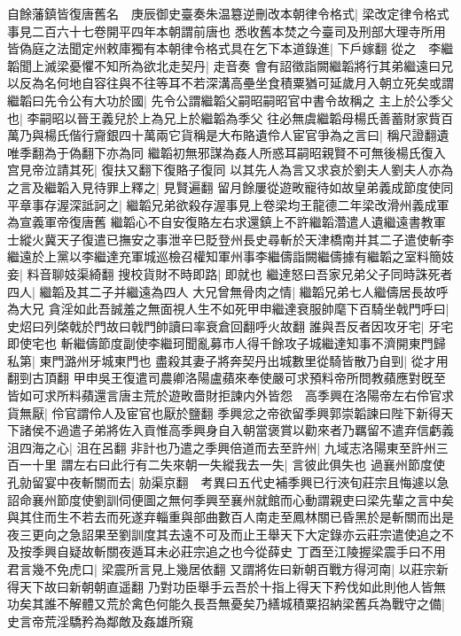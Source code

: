自餘藩鎮皆復唐舊名　庚辰御史臺奏朱温簒逆刪改本朝律令格式|{
	梁改定律令格式事見二百六十七卷開平四年本朝謂前唐也}
悉收舊本焚之今臺司及刑部大理寺所用皆偽庭之法聞定州敕庫獨有本朝律令格式具在乞下本道錄進|{
	下戶嫁翻}
從之　李繼韜聞上滅梁憂懼不知所為欲北走契丹|{
	走音奏}
會有詔徵詣闕繼韜將行其弟繼遠曰兄以反為名何地自容往與不往等耳不若深溝高壘坐食積粟猶可延歲月入朝立死矣或謂繼韜曰先令公有大功於國|{
	先令公謂繼韜父嗣昭嗣昭官中書令故稱之}
主上於公季父也|{
	李嗣昭以晉王義兒於上為兄上於繼韜為季父}
往必無虞繼韜母楊氏善蓄財家貲百萬乃與楊氏偕行齎銀四十萬兩它貨稱是大布賂遺伶人宦官爭為之言曰|{
	稱尺證翻遺唯季翻為于偽翻下亦為同}
繼韜初無邪謀為姦人所惑耳嗣昭親賢不可無後楊氏復入宫見帝泣請其死|{
	復扶又翻下復賂子復同}
以其先人為言又求哀於劉夫人劉夫人亦為之言及繼韜入見待罪上釋之|{
	見賢遍翻}
留月餘屢從遊畋寵待如故皇弟義成節度使同平章事存渥深詆訶之|{
	繼韜兄弟欲殺存渥事見上卷梁均王龍德二年梁改滑州義成軍為宣義軍帝復唐舊}
繼韜心不自安復賂左右求還鎮上不許繼韜濳遣人遺繼遠書教軍士縱火冀天子復遣已撫安之事泄辛巳貶登州長史尋斬於天津橋南并其二子遣使斬李繼遠於上黨以李繼達充軍城巡檢召權知軍州事李繼儔詣闕繼儔據有繼韜之室料簡妓妾|{
	料音聊妓渠綺翻}
搜校貨財不時即路|{
	即就也}
繼達怒曰吾家兄弟父子同時誅死者四人|{
	繼韜及其二子并繼遠為四人}
大兄曾無骨肉之情|{
	繼韜兄弟七人繼儔居長故呼為大兄}
貪淫如此吾誠羞之無面視人生不如死甲申繼達衰服帥麾下百騎坐戟門呼曰|{
	史炤曰列棨戟於門故曰戟門帥讀曰率衰倉回翻呼火故翻}
誰與吾反者因攻牙宅|{
	牙宅即使宅也}
斬繼儔節度副使李繼珂聞亂募市人得千餘攻子城繼達知事不濟開東門歸私第|{
	東門潞州牙城東門也}
盡殺其妻子將奔契丹出城數里從騎皆散乃自剄|{
	從才用翻剄古頂翻}
甲申吳王復遣司農卿洛陽盧蘋來奉使嚴可求預料帝所問教蘋應對旣至皆如可求所料蘋還言唐主荒於遊畋嗇財拒諫内外皆怨　高季興在洛陽帝左右伶官求貨無厭|{
	伶官謂伶人及宦官也厭於鹽翻}
季興忿之帝欲留季興郭崇韜諫曰陛下新得天下諸侯不過遣子弟將佐入貢惟高季興身自入朝當褒賞以勸來者乃羈留不遣弃信虧義沮四海之心|{
	沮在呂翻}
非計也乃遣之季興倍道而去至許州|{
	九域志洛陽東至許州三百一十里}
謂左右曰此行有二失來朝一失縱我去一失|{
	言彼此俱失也}
過襄州節度使孔勍留宴中夜斬關而去|{
	勍渠京翻　考異曰五代史補季興已行浹旬莊宗且悔遽以急詔命襄州節度使劉訓伺便圖之無何季興至襄州就館而心動謂親吏曰梁先輩之言中矣與其住而生不若去而死遂弃輜重與部曲數百人南走至鳳林關已昏黑於是斬關而出是夜三更向之急詔果至劉訓度其去遠不可及而止王舉天下大定錄亦云莊宗遣使追之不及按季興自疑故斬關夜遁耳未必莊宗追之也今從薛史}
丁酉至江陵握梁震手曰不用君言幾不免虎口|{
	梁震所言見上幾居依翻}
又謂將佐曰新朝百戰方得河南|{
	以莊宗新得天下故曰新朝朝直遥翻}
乃對功臣舉手云吾於十指上得天下矜伐如此則他人皆無功矣其誰不解體又荒於禽色何能久長吾無憂矣乃繕城積粟招納梁舊兵為戰守之備|{
	史言帝荒淫驕矜為鄰敵及姦雄所窺}


